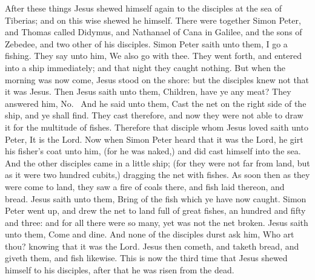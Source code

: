  After these things Jesus shewed himself again to the
disciples at the sea of Tiberias; and on this wise shewed he himself.
 There were together Simon Peter, and Thomas called
Didymus, and Nathanael of Cana in Galilee, and the sons of Zebedee, and
two other of his disciples.  Simon Peter saith unto them,
I go a fishing. They say unto him, We also go with thee. They went
forth, and entered into a ship immediately; and that night they caught
nothing.  But when the morning was now come, Jesus stood
on the shore: but the disciples knew not that it was Jesus.
 Then Jesus saith unto them, Children, have ye any meat?
They answered him, No.~ And he said unto them, Cast the
net on the right side of the ship, and ye shall find. They cast
therefore, and now they were not able to draw it for the multitude of
fishes.  Therefore that disciple whom Jesus loved saith
unto Peter, It is the Lord. Now when Simon Peter heard that it was the
Lord, he girt his fisher's coat unto him, (for he was naked,) and did
cast himself into the sea.  And the other disciples came
in a little ship; (for they were not far from land, but as it were two
hundred cubits,) dragging the net with fishes.  As soon
then as they were come to land, they saw a fire of coals there, and fish
laid thereon, and bread.  Jesus saith unto them, Bring of
the fish which ye have now caught.  Simon Peter went up,
and drew the net to land full of great fishes, an hundred and fifty and
three: and for all there were so many, yet was not the net broken.
 Jesus saith unto them, Come and dine. And none of the
disciples durst ask him, Who art thou? knowing that it was the Lord.
 Jesus then cometh, and taketh bread, and giveth them,
and fish likewise.  This is now the third time that Jesus
shewed himself to his disciples, after that he was risen from the dead.


